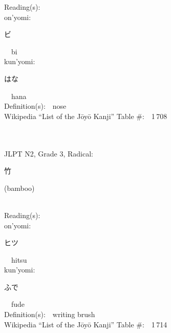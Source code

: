 \begin{multicols}{2}
Reading(s):\ \ \\
{\hspace*{1em}}on'yomi:\ \ \\
{\hspace*{2em}}{\begin{CJK}{UTF8}{min} ビ \end{CJK}}\ \ bi\ \ \\
{\hspace*{1em}}kun'yomi:\ \ \\
{\hspace*{2em}}{\begin{CJK}{UTF8}{min} はな \end{CJK}}\ \ hana\ \ \\
Definition(s):\ \ nose \\
Wikipedia ``List of the J\=oy\=o Kanji'' Table \#:\ \ 1\,708 \\
\ \ \\
{\fontsize{34pt}{40pt}  }\ \ \\  %
{JLPT N2, Grade 3, Radical:\ \ {\begin{CJK}{UTF8}{min} 竹 \end{CJK}} (bamboo) } \\
Reading(s):\ \ \\
{\hspace*{1em}}on'yomi:\ \ \\
{\hspace*{2em}}{\begin{CJK}{UTF8}{min} ヒツ \end{CJK}}\ \ hitsu\ \ \\
{\hspace*{1em}}kun'yomi:\ \ \\
{\hspace*{2em}}{\begin{CJK}{UTF8}{min} ふで \end{CJK}}\ \ fude\ \ \\
Definition(s):\ \ writing brush \\
Wikipedia ``List of the J\=oy\=o Kanji'' Table \#:\ \ 1\,714 \\
\ \ \\
{\fontsize{34pt}{40pt}  }\ \ \\  %

\end{multicols}
